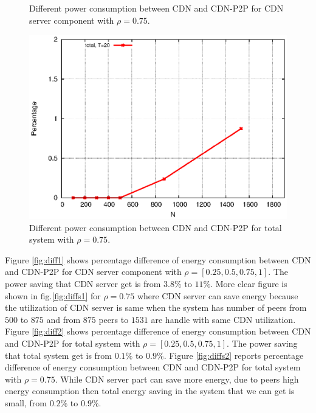 \documentclass[JIP]{ipsj}
\begin{document}
\begin{figure}[t]
\begin{minipage}[b]{0.4\linewidth}
	\caption{Different power consumption between CDN and CDN-P2P for CDN server component with $\rho=0.75$.}
	\label{fig:diffs1}
\end{minipage}
\hfill
\begin{minipage}[b]{0.4\linewidth}
	\includegraphics[scale=0.5]{graphs/diff-3-total.eps}
	\caption{Different power consumption between CDN and CDN-P2P for total system with $\rho=0.75$.}
	\label{fig:diffs2}
\end{minipage}
\label{fig:maindiff}
\end{figure}

Figure \ref{fig:diff1} shows percentage difference of energy consumption between CDN and CDN-P2P for CDN server component with $\rho=[0.25,0.5,0.75,1]$.
The power saving that CDN server get is from $3.8\%$ to $11\%$.
More clear figure is shown in fig.\ref{fig:diffs1} for $\rho=0.75$ where CDN server can save energy because the utilization of CDN server is same when the system has number of peers from $500$ to $875$ and from $875$ peers to $1531$ are handle with same CDN utilization.   
Figure \ref{fig:diff2} shows percentage difference of energy consumption between CDN and CDN-P2P for total system with $\rho=[0.25,0.5,0.75,1]$.
The power saving that total system get is from $0.1\%$ to $0.9\%$.
Figure \ref{fig:diffs2} reports percentage difference of energy consumption between CDN and CDN-P2P for total system with $\rho=0.75$.
While CDN server part can save more energy, due to peers high energy consumption then total energy saving in the system that we can get is small, from $0.2\%$ to $0.9\%$.
\end{document}
